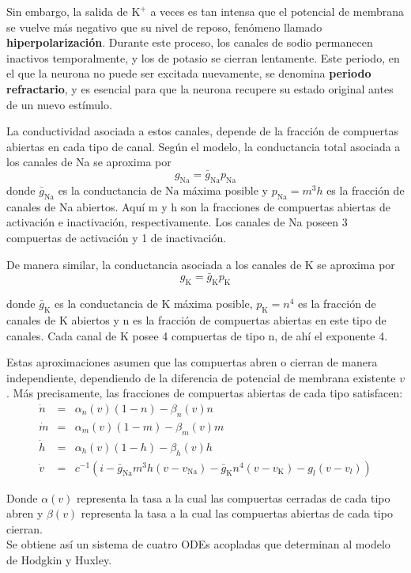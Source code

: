 \documentclass[aps,prl,twocolumn,groupedaddress]{revtex4-2}
\begin{document}
Sin embargo, la salida de $\mathrm{K}^+$ a veces es tan intensa que el potencial de membrana se vuelve más negativo que su nivel de reposo, fenómeno llamado \textbf{hiperpolarización}. Durante este proceso, los canales de sodio permanecen inactivos temporalmente, y los de potasio se cierran lentamente. Este periodo, en el que la neurona no puede ser excitada nuevamente, se denomina \textbf{periodo refractario}, y es esencial para que la neurona recupere su estado original antes de un nuevo estímulo.

La conductividad asociada a estos canales, depende de la fracción de compuertas abiertas en cada tipo de canal. Según el modelo, la conductancia total asociada a los canales de Na se aproxima por
$$g_{\mathrm{Na}} = \bar{g}_{\mathrm{Na}}p_{\mathrm{Na}}$$
donde $\bar{g}_{\mathrm{Na}}$ es la conductancia de $\mathrm{Na}$ máxima posible y $p_{\mathrm{Na}} = m^3h$  es la fracción de canales de Na abiertos. Aquí m y h son la fracciones de compuertas abiertas de activación e inactivación, respectivamente. Los canales de Na poseen 3 compuertas de activación y 1 de inactivación.

De manera similar, la conductancia asociada a los canales de K se aproxima por 
$$g_{\mathrm{K}} = \bar{g}_{\mathrm{K}}p_{\mathrm{K}}$$ 

donde $\bar{g}_{\mathrm{K}}$  es la conductancia de K máxima posible, $p_{\mathrm{K}} = n^4$ es la fracción de canales de K abiertos y n es la fracción de compuertas abiertas en este tipo de canales. Cada canal de K posee 4 compuertas de tipo n, de ahí el exponente 4.

Estas aproximaciones asumen que las compuertas abren o cierran de manera independiente, dependiendo de la diferencia de potencial de membrana existente $v$. Más precisamente, las fracciones de compuertas abiertas de cada tipo satisfacen:
\begin{eqnarray*}
\dot{n}&=&\alpha_n(v)(1-n)-\beta_n(v) n\\
\dot{m}&=&\alpha_m(v)(1-m)-\beta_m(v) m\\
\dot{h}&=&\alpha_h(v)(1-h)-\beta_h(v) h\\
\dot{v}&=&c^{-1}(i-\bar{g}_{\mathrm{Na}}m^3h(v-v_{\mathrm{Na}})-\bar{g}_{\mathrm{K}}n^4(v-v_{\mathrm{K}})-g_{l}(v-v_{l}))
\end{eqnarray*}

Donde $\alpha(v)$ representa la tasa a la cual las compuertas cerradas de cada tipo abren y $\beta(v)$ representa la tasa a la cual las compuertas abiertas de cada tipo cierran.\\
Se obtiene así un sistema de cuatro ODEs acopladas  que determinan al modelo de Hodgkin y Huxley.\\
\end{document}
